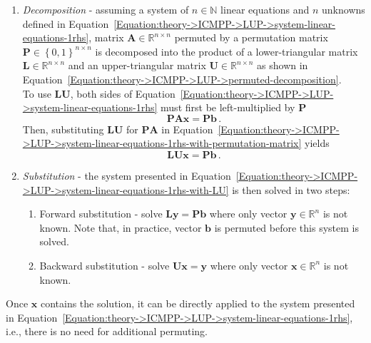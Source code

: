 \begin{enumerate}
	\item \label{Item:theory->ICMPP->LUP->solving-system-linear-equations->decomposition}
		\textit{Decomposition} - assuming a system of $n \in \mathbb{N}$ linear equations and $n$ unknowns defined in Equation~\ref{Equation:theory->ICMPP->LUP->system-linear-equations-1rhs}, matrix $\mathbf{A} \in \mathbb{R}^{n\times n}$ permuted by a permutation matrix $\mathbf{P} \in \left\{0,1\right\}^{n \times n}$ is decomposed into the product of a lower-triangular matrix $\mathbf{L} \in \mathbb{R}^{n\times n}$ and an upper-triangular matrix $\mathbf{U} \in \mathbb{R}^{n\times n}$ as shown in Equation~\ref{Equation:theory->ICMPP->LUP->permuted-decomposition}.\\
		To use $\mathbf{LU}$, both sides of Equation~\ref{Equation:theory->ICMPP->LUP->system-linear-equations-1rhs} must first be left-multiplied by $\mathbf{P}$
		\begin{equation}
			\mathbf{PAx} = \mathbf{Pb} \,.
			\label{Equation:theory->ICMPP->LUP->system-linear-equations-1rhs-with-permutation-matrix}
		\end{equation}
		Then, substituting $\mathbf{LU}$ for $\mathbf{PA}$ in Equation~\ref{Equation:theory->ICMPP->LUP->system-linear-equations-1rhs-with-permutation-matrix} yields
		\begin{equation}
			\mathbf{LUx} = \mathbf{Pb} \,.
			\label{Equation:theory->ICMPP->LUP->system-linear-equations-1rhs-with-LU}
		\end{equation}
	\item \label{Item:theory->ICMPP->LUP->solving-system-linear-equations->substitution}
		\textit{Substitution} - the system presented in Equation~\ref{Equation:theory->ICMPP->LUP->system-linear-equations-1rhs-with-LU} is then solved in two steps:
		\begin{enumerate}
			\item Forward substitution - solve $\mathbf{Ly} = \mathbf{Pb}$ where only vector $\mathbf{y} \in \mathbb{R}^n$ is not known.
Note that, in practice, vector $\mathbf{b}$ is permuted before this system is solved.
			\item Backward substitution - solve $\mathbf{Ux} = \mathbf{y}$ where only vector $\mathbf{x} \in \mathbb{R}^n$ is not known.
		\end{enumerate}
\end{enumerate}

Once $\mathbf{x}$ contains the solution, it can be directly applied to the system presented in Equation~\ref{Equation:theory->ICMPP->LUP->system-linear-equations-1rhs}, i.e., there is no need for additional permuting.

